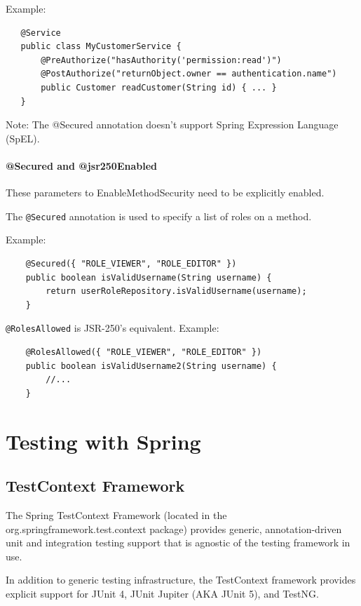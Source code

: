 \documentclass{scrartcl}
\begin{document}
Example:

\begin{lstlisting}
   @Service
   public class MyCustomerService {
       @PreAuthorize("hasAuthority('permission:read')")
       @PostAuthorize("returnObject.owner == authentication.name")
       public Customer readCustomer(String id) { ... }
   }
\end{lstlisting}

Note: The @Secured annotation doesn’t support Spring Expression Language (SpEL).

\paragraph{@Secured and @jsr250Enabled}

These parameters to EnableMethodSecurity need to be explicitly enabled.

The \lstinline|@Secured| annotation is used to specify a list of roles on a method.

Example:

\begin{lstlisting}
    @Secured({ "ROLE_VIEWER", "ROLE_EDITOR" })
    public boolean isValidUsername(String username) {
        return userRoleRepository.isValidUsername(username);
    }

\end{lstlisting}

\lstinline|@RolesAllowed| is JSR-250’s equivalent. Example:

\begin{lstlisting}
    @RolesAllowed({ "ROLE_VIEWER", "ROLE_EDITOR" })
    public boolean isValidUsername2(String username) {
        //...
    }
\end{lstlisting}

\section{Testing with Spring}

\subsection{TestContext Framework}

The Spring TestContext Framework (located in the org.springframework.test.context package) provides generic, annotation-driven unit and integration testing support that is agnostic of the testing framework in use.

In addition to generic testing infrastructure, the TestContext framework provides explicit support for JUnit 4, JUnit Jupiter (AKA JUnit 5), and TestNG.
\end{document}
